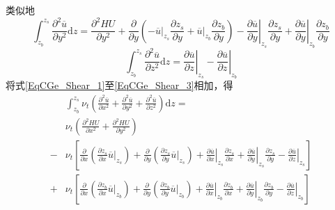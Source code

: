 类似地
\begin{equation}
  \int_{z_{b}}^{ z_{s}}\!
  \frac{\partial^{2} \overline{u}}{\partial y^{2}}
  \mathrm{d}z
  =
  \frac{\partial^{2} HU}{\partial y^{2}} +
  \frac{\partial}{\partial y}
  \left(
  -
  \left.\overline{u}\right|_{z_{s}}\frac{\partial  z_{s}}{\partial y}
  +
  \left.\overline{u}\right|_{z_{b}}\frac{\partial z_{b}}{\partial y}
  \right)
  -
  \left.\frac{\partial \overline{u}}{\partial y}\right|_{z_{s}}\frac{\partial  z_{s}}{\partial y}
  +
  \left.\frac{\partial \overline{u}}{\partial y}\right|_{z_{b}}\frac{\partial z_{b}}{\partial y}
  \label{EqCGe_Shear_2}
\end{equation}
\begin{equation}
  \int_{z_{b}}^{ z_{s}}\!
  \frac{\partial^{2} \overline{u}}{\partial z^{2}}
  \mathrm{d}z
  =
  \left.\frac{\partial \overline{u}}{\partial z}\right|_{z_{s}}
  -
  \left.\frac{\partial \overline{u}}{\partial z}\right|_{z_{b}}
  \label{EqCGe_Shear_3}
\end{equation}
将式\eqref{EqCGe_Shear_1}至\eqref{EqCGe_Shear_3}相加，得
\begin{equation}
  \begin{aligned}
    &\int_{z_{b}}^{ z_{s}}\!
    \nu_{t}
    \left(
    \frac{\partial^{2} \overline{u}}{\partial x^{2}} +
    \frac{\partial^{2} \overline{u}}{\partial y^{2}} +
    \frac{\partial^{2} \overline{u}}{\partial z^{2}}
    \right)
    \mathrm{d}z =\\
    &
    \nu_{t}
    \left(
    \frac{\partial^{2} HU}{\partial x^{2}} +
    \frac{\partial^{2} HU}{\partial y^{2}}
    \right)
    \\
    -&\nu_{t}
    \left[
      \frac{\partial}{\partial x}
      \left(
      \frac{\partial  z_{s}}{\partial x}
      \left.\overline{u}\right|_{z_{s}}
      \right)
      +
      \frac{\partial}{\partial y}
      \left(
      \frac{\partial  z_{s}}{\partial y}
      \left.\overline{u}\right|_{z_{s}}
      \right)
      +
      \left.\frac{\partial \overline{u}}{\partial x}\right|_{z_{s}}
      \frac{\partial  z_{s}}{\partial x}
      +
      \left.\frac{\partial \overline{u}}{\partial y}\right|_{z_{s}}
      \frac{\partial  z_{s}}{\partial y}
      -
      \left.\frac{\partial \overline{u}}{\partial z}\right|_{z_{s}}
    \right]
    \\
    +&\nu_{t}
    \left[
      \frac{\partial}{\partial x}
      \left(
      \frac{\partial z_{b}}{\partial x}
      \left.\overline{u}\right|_{z_{b}}
      \right)
      +
      \frac{\partial}{\partial y}
      \left(
      \frac{\partial z_{b}}{\partial y}
      \left.\overline{u}\right|_{z_{b}}
      \right)
      +
      \left.\frac{\partial \overline{u}}{\partial x}\right|_{z_{b}}
      \frac{\partial z_{b}}{\partial x}
      +
      \left.\frac{\partial \overline{u}}{\partial y}\right|_{z_{b}}
      \frac{\partial z_{b}}{\partial y}
      -
      \left.\frac{\partial \overline{u}}{\partial z}\right|_{z_{b}}
    \right]
  \end{aligned}
  \label{EqCGe_Shear_Total}
\end{equation}
